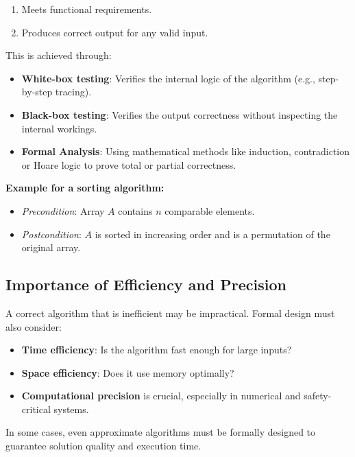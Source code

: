 \documentclass[12pt]{article}
\begin{document}
\begin{enumerate}
    \item Meets functional requirements.
    \item Produces correct output for any valid input.
\end{enumerate}

This is achieved through:

\begin{itemize}
    \item \textbf{White-box testing}: Verifies the internal logic of the algorithm (e.g., step-by-step tracing).
    \item \textbf{Black-box testing}: Verifies the output correctness without inspecting the internal workings.
    \item \textbf{Formal Analysis}: Using mathematical methods like induction, contradiction or Hoare logic to prove total or partial correctness.
\end{itemize}

\textbf{Example for a sorting algorithm:}

\begin{itemize}
    \item \textit{Precondition}: Array \( A \) contains \( n \) comparable elements.
    \item \textit{Postcondition}: \( A \) is sorted in increasing order and is a permutation of the original array.
\end{itemize}

\subsection{Importance of Efficiency and Precision}

A correct algorithm that is inefficient may be impractical. Formal design must also consider:

\begin{itemize}
    \item \textbf{Time efficiency}: Is the algorithm fast enough for large inputs?
    \item \textbf{Space efficiency}: Does it use memory optimally?
    \item \textbf{Computational precision} is crucial, especially in numerical and safety-critical systems.
\end{itemize}

In some cases, even approximate algorithms must be formally designed to guarantee solution quality and execution time.
\end{document}
